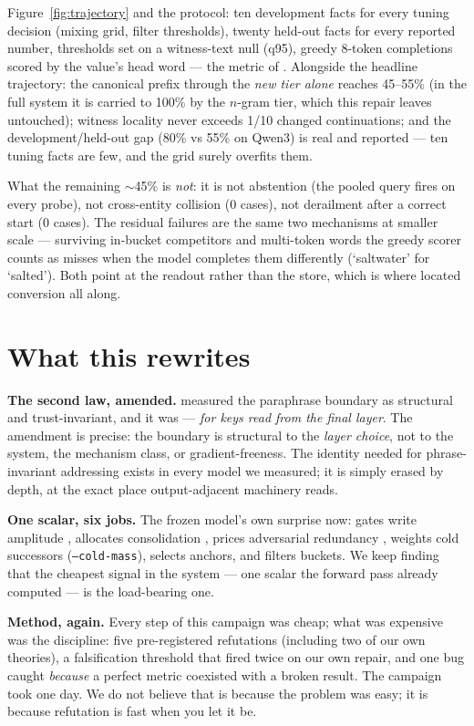 \documentclass[11pt]{article}
\begin{document}
Figure~\ref{fig:trajectory} and the protocol: ten development facts for every tuning decision (mixing grid, filter thresholds), twenty held-out facts for every reported number, thresholds set on a witness-text null (q95), greedy 8-token completions scored by the value's head word --- the metric of \cite{behavior}. Alongside the headline trajectory: the canonical prefix through the \emph{new tier alone} reaches 45--55\% (in the full system it is carried to 100\% by the $n$-gram tier, which this repair leaves untouched); witness locality never exceeds 1/10 changed continuations; and the development/held-out gap (80\% vs 55\% on Qwen3) is real and reported --- ten tuning facts are few, and the grid surely overfits them.

What the remaining $\sim$45\% is \emph{not}: it is not abstention (the pooled query fires on every probe), not cross-entity collision (0 cases), not derailment after a correct start (0 cases). The residual failures are the same two mechanisms at smaller scale --- surviving in-bucket competitors and multi-token words the greedy scorer counts as misses when the model completes them differently (`saltwater' for `salted'). Both point at the readout rather than the store, which is where \cite{behavior} located conversion all along.

\section{What this rewrites}\label{sec:discussion}

\textbf{The second law, amended.} \cite{behavior} measured the paraphrase boundary as structural and trust-invariant, and it was --- \emph{for keys read from the final layer}. The amendment is precise: the boundary is structural to the \emph{layer choice}, not to the system, the mechanism class, or gradient-freeness. The identity needed for phrase-invariant addressing exists in every model we measured; it is simply erased by depth, at the exact place output-adjacent machinery reads.

\textbf{One scalar, six jobs.} The frozen model's own surprise now: gates write amplitude \cite{sillage}, allocates consolidation \cite{hier}, prices adversarial redundancy \cite{behavior}, weights cold successors (\texttt{--cold-mass}), selects anchors, and filters buckets. We keep finding that the cheapest signal in the system --- one scalar the forward pass already computed --- is the load-bearing one.

\textbf{Method, again.} Every step of this campaign was cheap; what was expensive was the discipline: five pre-registered refutations (including two of our own theories), a falsification threshold that fired twice on our own repair, and one bug caught \emph{because} a perfect metric coexisted with a broken result. The campaign took one day. We do not believe that is because the problem was easy; it is because refutation is fast when you let it be.
\end{document}
